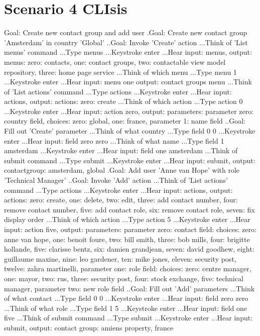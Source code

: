 \section{Scenario 4 CLIsis}
\label{section:scenario4clisis}
\begin{spverbatim}
Goal: Create new contact group and add user
.Goal: Create new contact group 'Amsterdam' in country 'Global'
..Goal: Invoke 'Create' action
...Think of 'List menus' command
...Type menus
...Keystroke enter
...Hear input: menus, output: menus: zero: contacts, one: contact groups, two: contactable view model repository, three: home page service
...Think of which menu
...Type menu 1
...Keystroke enter
...Hear input: menu one output: contact groups menu
...Think of 'List actions' command
...Type actions
...Keystroke enter
...Hear input: actions, output: actions: zero: create
...Think of which action
...Type action 0
...Keystroke enter
...Hear input: action zero, output: parameters: parameter zero: country field, choices: zero: global, one: france, parameter 1: name field
..Goal: Fill out 'Create' parameter
...Think of what country
...Type field 0 0
...Keystroke enter
...Hear input: field zero zero
...Think of what name
...Type field 1 amsterdam
...Keystroke enter
...Hear input: field one amsterdam
...Think of submit command
...Type submit
...Keystroke enter
...Hear input: submit, output: contactgroup: amsterdam, global
.Goal: Add user 'Anne van Hope' with role 'Technical Manager'
..Goal: Invoke 'Add' action
...Think of 'List actions' command
...Type actions
...Keystroke enter
...Hear input: actions, output: actions: zero: create, one: delete, two: edit, three: add contact number, four: remove contact number, five: add contact role, six: remove contact role, seven: fix display order
...Think of which action
...Type action 5
...Keystroke enter
...Hear input: action five, output: parameters: parameter zero: contact field: choices: zero: anne van hope, one: benoit foure, two: bill smith, three: bob mills, four: brigitte hollande, five: clarisse bentz, six: damien grandjean, seven: david goodhew, eight: guillaume maxine, nine: leo gardener, ten: mike jones, eleven: security post, twelve: zahra martinelli, parameter one: role field: choices: zero: centre manager, one: mayor, two: rus, three: security post, four: stock exchange, five: technical manager, parameter two: new role field
..Goal: Fill out 'Add' parameters
...Think of what contact
...Type field 0 0
...Keystroke enter
...Hear input: field zero zero
...Think of what role
...Type field 1 5
...Keystroke enter
...Hear input: field one five
...Think of submit command
...Type submit
...Keystroke enter
...Hear input: submit, output: contact group: amiens property, france
\end{spverbatim}

